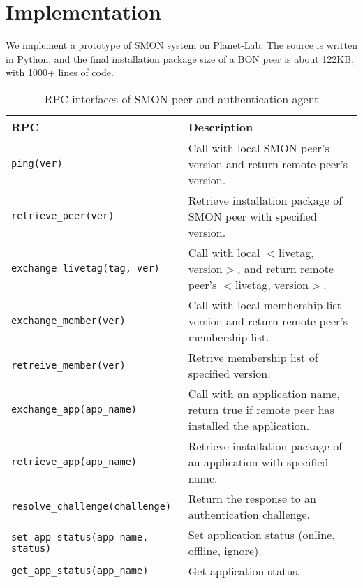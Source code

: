 \section{Implementation}
\label{sec:impl}

We implement a prototype of SMON system on Planet-Lab.  The
source is written in Python, and the final installation
package size of a BON peer is about 122KB, with 1000+ lines
of code.

\begin{table*}
\small
\centering
\begin{tabular}{|l|l|}

\hline
\textbf{RPC} & \textbf{Description} \\

\hline
\texttt{ping(ver)} & Call with local SMON peer's version and
return remote peer's version.\\

\hline
\texttt{retrieve\_peer(ver)} & Retrieve installation package
of SMON peer with specified version.\\

\hline
\texttt{exchange\_livetag(tag, ver)} & Call with local
$<$livetag, version$>$, and return remote peer's $<$livetag,
version$>$.\\

\hline
\texttt{exchange\_member(ver)} & Call with local membership
list version and return remote peer's membership list.\\

\hline
\texttt{retreive\_member(ver)} & Retrive membership list of
specified version.\\

\hline
\texttt{exchange\_app(app\_name)} & Call with an application
name, return true if remote peer has installed the
application.\\

\hline
\texttt{retrieve\_app(app\_name)} & Retrieve installation package
of an application with specified name.\\

\hline
\texttt{resolve\_challenge(challenge)} & Return the response
to an authentication challenge.\\

\hline
\texttt{set\_app\_status(app\_name, status)} & Set application status (online,
offline, ignore).\\

\hline
\texttt{get\_app\_status(app\_name)} & Get application status. \\

\hline

\end{tabular}
\caption{RPC interfaces of SMON peer and authentication
agent}
\label{fig:rpc}
\end{table*}

